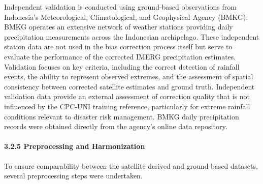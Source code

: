 \documentclass[
]{article}
\begin{document}
Independent validation is conducted using ground-based observations from
Indonesia's Meteorological, Climatological, and Geophysical Agency
(BMKG). BMKG operates an extensive network of weather stations providing
daily precipitation measurements across the Indonesian archipelago.
These independent station data are not used in the bias correction
process itself but serve to evaluate the performance of the corrected
IMERG precipitation estimates. Validation focuses on key criteria,
including the correct detection of rainfall events, the ability to
represent observed extremes, and the assessment of spatial consistency
between corrected satellite estimates and ground truth. Independent
validation data provide an external assessment of correction quality
that is not influenced by the CPC-UNI training reference, particularly
for extreme rainfall conditions relevant to disaster risk management.
BMKG daily precipitation records were obtained directly from the
agency's online data repository.

\paragraph{3.2.5 Preprocessing and
Harmonization}\label{preprocessing-and-harmonization}

To ensure comparability between the satellite-derived and ground-based
datasets, several preprocessing steps were undertaken.
\end{document}
